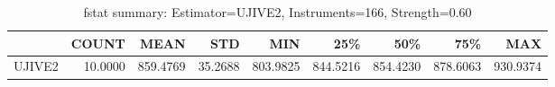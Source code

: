 \begin{table}[ht]
\centering
\caption{fstat summary: Estimator=UJIVE2, Instruments=166, Strength=0.60}
\begin{tabular}{lrrrrrrrr}
\toprule
 & COUNT & MEAN & STD & MIN & 25\% & 50\% & 75\% & MAX \\
\midrule
UJIVE2 & 10.0000 & 859.4769 & 35.2688 & 803.9825 & 844.5216 & 854.4230 & 878.6063 & 930.9374 \\
\bottomrule
\end{tabular}
\end{table}
